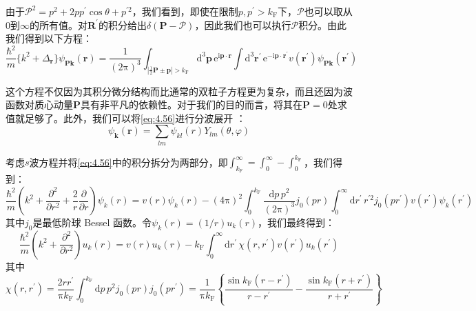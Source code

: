 由于$\mathcal{P}^{2}=p^{2}+2pp^{\prime}\cos\theta+p^{\prime2}$，我们看到，即使在限制$p,p^{\prime}>k_{\text{F}}$下，$\mathcal{P}$也可以取从$0$到$\infty$的所有值。对$\boldsymbol{R}^{\prime}$的积分给出$\delta(\boldsymbol{P}-\boldsymbol{\mathcal{P}})$，因此我们也可以执行$\boldsymbol{\mathcal{P}}$积分。由此我们得到以下方程：
\begin{equation}
\frac{\hbar^{2}}{m}\{k^{2}+\Delta_{\boldsymbol{r}}\}\psi_{\boldsymbol{P}\boldsymbol{k}}(\boldsymbol{r})=\frac{1}{(2\mathrm{\pi})^{3}}\int_{\left|\frac{1}{2}\boldsymbol{P}\pm\boldsymbol{p}\right|>k_{\text{F}}}\mathrm{d}^{3}\boldsymbol{p}\,\mathrm{e}^{\mathrm{i}\boldsymbol{p}\cdot\boldsymbol{r}}\int\mathrm{d}^{3}\boldsymbol{r}^{\prime}\,\mathrm{e}^{-\mathrm{i}\boldsymbol{p}\cdot\boldsymbol{r}^{\prime}}v(\boldsymbol{r}^{\prime})\psi_{\boldsymbol{P}\boldsymbol{k}}(\boldsymbol{r}^{\prime})\label{eq:4.56}
\end{equation}

这个方程不仅因为其积分微分结构而比通常的双粒子方程更为复杂，而且还因为波函数对质心动量$\boldsymbol{P}$具有非平凡的依赖性。对于我们的目的而言，将其在$\boldsymbol{P}=0$处求值就足够了。此外，我们可以将\ref{eq:4.56}进行分波展开
\cite[第 X 章第 8 节]{Me61}：
\begin{equation}
\psi_{\boldsymbol{k}}(\boldsymbol{r})=\sum_{lm}\psi_{kl}(r)Y_{lm}(\theta,\varphi)\label{eq:4.57}
\end{equation}

考虑$s$波方程并将\ref{eq:4.56}中的积分拆分为两部分，即$\int^{\infty}_{k_{\text{F}}}=\int^{\infty}_{0}-\int^{k_{\text{F}}}_{0}$，我们得到：
\begin{equation}
\frac{\hbar^{2}}{m}\left(k^{2}+\frac{\partial^{2}}{\partial r^{2}}+\frac{2}{r}\frac{\partial}{\partial r}\right)\psi_{k}(r)=v(r)\psi_{k}(r)-(4\mathrm{\pi})^{2}\int^{k_{\text{F}}}_{0}\frac{\mathrm{d}p\,p^{2}}{(2\mathrm{\pi})^{3}}j_{0}(pr)\int^{\infty}_{0}\mathrm{d}r^{\prime}\,r^{\prime2}j_{0}(pr^{\prime})v(r^{\prime})\psi_{k}(r^{\prime})\label{eq:4.58}
\end{equation}
其中$j_{0}$是最低阶球 Bessel 函数。令$\psi_{k}(r)=(1/r)u_{k}(r)$，我们最终得到：
\begin{equation}
\frac{\hbar^{2}}{m}\left(k^{2}+\frac{\partial^{2}}{\partial r^{2}}\right)u_{k}(r)=v(r)u_{k}(r)-k_{\text{F}}\int^{\infty}_{0}\mathrm{d}r^{\prime}\,\chi(r,r^{\prime})v(r^{\prime})u_{k}(r^{\prime})\label{eq:4.59}
\end{equation}
其中
\begin{equation}
\chi(r,r^{\prime})=\frac{2rr^{\prime}}{\mathrm{\pi}k_{\text{F}}}\int^{k_{\text{F}}}_{0}\mathrm{d}p\,p^{2}j_{0}(pr)j_{0}(pr^{\prime})=\frac{1}{\mathrm{\pi}k_{\text{F}}}\left\{ \frac{\sin k_{\text{F}}(r-r^{\prime})}{r-r^{\prime}}-\frac{\sin k_{\text{F}}(r+r^{\prime})}{r+r^{\prime}}\right\} \label{eq:4.60}
\end{equation}

